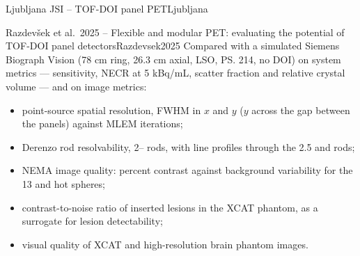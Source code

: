 \begin{programnote}{Ljubljana JSI -- TOF-DOI panel PET}{Ljubljana}
\begin{papernote}{Razdevšek et al.\ 2025 -- Flexible and modular PET: evaluating the potential of TOF-DOI panel detectors}{Razdevsek2025}
Compared with a simulated Siemens Biograph Vision (78 cm ring, 26.3 cm axial,
 LSO, \ps{214}, no DOI) on system metrics ---
sensitivity, NECR at 5 kBq/mL, scatter fraction and relative crystal volume ---
and on image metrics:
\begin{itemize}
	\item point-source spatial resolution, FWHM in $x$ and $y$ ($y$ across
		the gap between the panels) against MLEM iterations;
	\item Derenzo rod resolvability, 2-- rods, with line profiles
		through the 2.5 and  rods;
	\item NEMA image quality: percent contrast against background variability
		for the 13 and  hot spheres;
	\item contrast-to-noise ratio of inserted lesions in the XCAT phantom, as a
		surrogate for lesion detectability;
	\item visual quality of XCAT and high-resolution brain phantom images.
\end{itemize}


\end{papernote}
\end{programnote}
